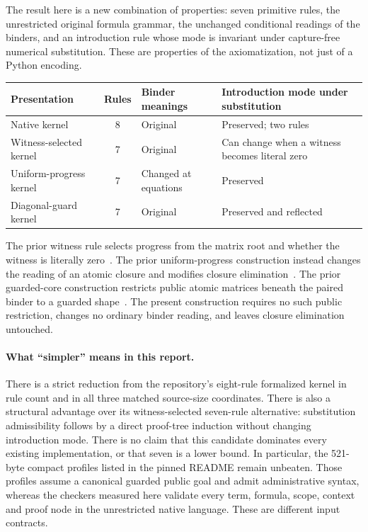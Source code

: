 \documentclass[11pt]{article}
\theoremstyle{definition}
\theoremstyle{remark}
\begin{document}
The result here is a new combination of properties: seven primitive rules,
the unrestricted original formula grammar, the unchanged conditional
readings of the binders, and an introduction rule whose mode is invariant
under capture-free numerical substitution. These are properties of the
axiomatization, not just of a Python encoding.

\begin{center}
\small
\begin{tabular}{@{}>{\raggedright\arraybackslash}p{34mm}c>{\raggedright\arraybackslash}p{34mm}>{\raggedright\arraybackslash}p{35mm}@{}}
\toprule
Presentation & Rules & Binder meanings & Introduction mode under substitution\\
\midrule
Native kernel & 8 & Original & Preserved; two rules\\
Witness-selected kernel & 7 & Original & Can change when a witness becomes literal zero\\
Uniform-progress kernel & 7 & Changed at equations & Preserved\\
Diagonal-guard kernel & 7 & Original & Preserved and reflected\\
\bottomrule
\end{tabular}
\end{center}

The prior witness rule selects progress from the matrix root and whether
the witness is literally zero~\cite{witness}. The prior uniform-progress
construction instead changes the reading of an atomic closure and modifies
closure elimination~\cite{uniform}. The prior guarded-core construction
restricts public atomic matrices beneath the paired binder to a guarded
shape~\cite{guarded}. The present construction requires no such public
restriction, changes no ordinary binder reading, and leaves closure
elimination untouched.

\paragraph{What ``simpler'' means in this report.}
There is a strict reduction from the repository's eight-rule formalized
kernel in rule count and in all three matched source-size coordinates.
There is also a structural advantage over its witness-selected seven-rule
alternative: substitution admissibility follows by a direct proof-tree
induction without changing introduction mode. There is no claim that this
candidate dominates every existing implementation, or that seven is a
lower bound. In particular, the 521-byte compact profiles listed in the
pinned README remain unbeaten. Those profiles assume a canonical guarded public goal and admit
administrative syntax, whereas the checkers measured here validate every
term, formula, scope, context and proof node in the unrestricted native
language. These are different input contracts.
\end{document}
